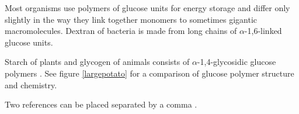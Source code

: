 Most organisms use polymers of glucose units for energy storage and differ only slightly in the way they link together monomers to sometimes gigantic macromolecules. Dextran of bacteria is made from long chains of $\alpha$-1,6-linked glucose units. 









Starch of plants and glycogen of animals consists of $\alpha$-1,4-glycosidic glucose polymers \cite{lastname07}. See figure \ref{largepotato} for a comparison of glucose polymer structure and chemistry. 

Two references can be placed separated by a comma \cite{lastname07,name06}.








